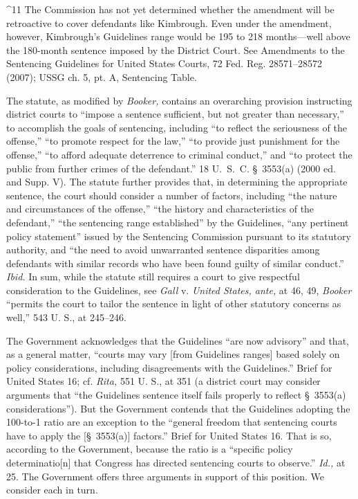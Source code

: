 {{^11 The Commission has not yet determined whether the amendment will
be retroactive to cover defendants like Kimbrough. Even under the
amendment, however, Kimbrough's Guidelines range would be 195 to 218
months---well above the 180-month sentence imposed by the District
Court. See Amendments to the Sentencing Guidelines for United States
Courts, 72 Fed. Reg. 28571--28572 (2007); USSG ch. 5, pt. A, Sentencing
Table.

  The statute, as modified by \emph{Booker,} contains an overarching
provision instructing district courts to ``impose a sentence
sufficient, but not greater than necessary,'' to accomplish the
goals of sentencing, including ``to reflect the seriousness of the
offense,'' ``to promote respect for the law,'' ``to provide just
punishment for the offense,'' ``to afford adequate deterrence to
criminal conduct,'' and ``to protect the public from further crimes
of the defendant.'' 18 U.~S.~C. \S~3553(a) (2000 ed. and Supp.
V). The statute further provides that, in determining the appropriate
sentence, the court should consider a number of factors, including
``the nature and circumstances of the offense,'' ``the history
and characteristics of the defendant,'' ``the sentencing range
established'' by the Guidelines, ``any pertinent policy statement''
issued by the Sentencing Commission pursuant to its statutory authority,
and ``the need to avoid unwarranted sentence disparities among
defendants with similar records who have been found guilty of similar
conduct.'' \emph{Ibid.} In sum, while the statute still requires a
court to give respectful consideration to the Guidelines, see \emph{Gall}
v. \emph{United States, ante,} at 46, 49, \emph{Booker} ``permits the court
to tailor the sentence in light of other statutory concerns as well,''
543 U. S., at 245--246.

  The Government acknowledges that the Guidelines ``are now advisory''
and that, as a general matter, ``courts may vary [from Guidelines
ranges] based solely on policy considerations, including disagreements
with the Guidelines.'' Brief for United States 16; cf. \emph{Rita,}
551 U. S., at 351 (a dis\newpage trict court may consider arguments that
``the Guidelines sentence itself fails properly to reflect \S~3553(a)
considerations''). But the Government contends that the Guidelines
adopting the 100-to-1 ratio are an exception to the ``general freedom
that sentencing courts have to apply the [\S~3553(a)] factors.''
Brief for United States 16. That is so, according to the Government,
because the ratio is a ``specific policy determinatio[n] that Congress
has directed sentencing courts to observe.'' \emph{Id.,} at 25. The
Government offers three arguments in support of this position. We
consider each in turn.


}}
